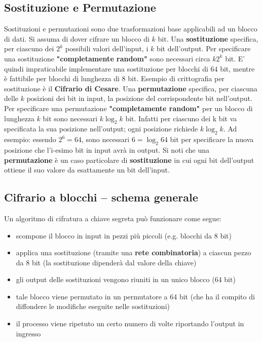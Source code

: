 \subsection{Sostituzione e Permutazione}
Sostituzioni e permutazioni sono due trasformazioni base applicabili ad un blocco di dati.\newline \newline
Si assuma di dover cifrare un blocco di $k$ bit. Una \textbf{sostituzione} specifica, per ciascuno dei $2^k$ possibili valori dell'input, i $k$ bit dell'output. Per specificare una sostituzione \textbf{"completamente random"} sono necessari circa $k2^k$ bit. E' quindi impraticabile implementare una sostituzione per blocchi di $64$ bit, mentre è fattibile per blocchi di lunghezza di $8$ bit. Esempio di crittografia per sostituzione è il \textbf{Cifrario di Cesare}.\newline \newline
Una \textbf{permutazione} specifica, per ciascuna delle $k$ posizioni dei bit in input, la posizione del corrispondente bit nell'output. Per specificare una permutazione \textbf{"completamente random"} per un blocco di
lunghezza $k$ bit sono necessari $k\log_2 k$ bit. Infatti per ciascuno dei k bit va specificata la sua posizione nell'output; ogni posizione richiede $k\log_2 k$. Ad esempio: essendo $2^6 = 64$, sono necessari $6 = \log_2 {64}$ bit per specificare la nuova posizione che l'i-esimo bit in input avrà in output. \newline \newline
Si noti che una \textbf{permutazione} è un caso particolare di \textbf{sostituzione} in cui ogni bit dell'output ottiene il suo valore da esattamente un bit dell'input.

\subsection{Cifrario a blocchi – schema generale}
Un algoritmo di cifratura a chiave segreta può funzionare come segue:
\begin{itemize}
  \item scompone il blocco in input in pezzi più piccoli (e.g. blocchi da 8 bit)
  \item applica una sostituzione (tramite una \textbf{rete combinatoria}) a ciascun pezzo da 8 bit (la sostituzione dipenderà dal valore della chiave)
  \item gli output delle sostituzioni vengono riuniti in un unico blocco (64 bit)
  \item tale blocco viene permutato in un permutatore a 64 bit (che ha il compito di diffondere le modifiche eseguite nelle sostituzioni)
  \item il processo viene ripetuto un certo numero di volte riportando l'output in ingresso
\end{itemize}
